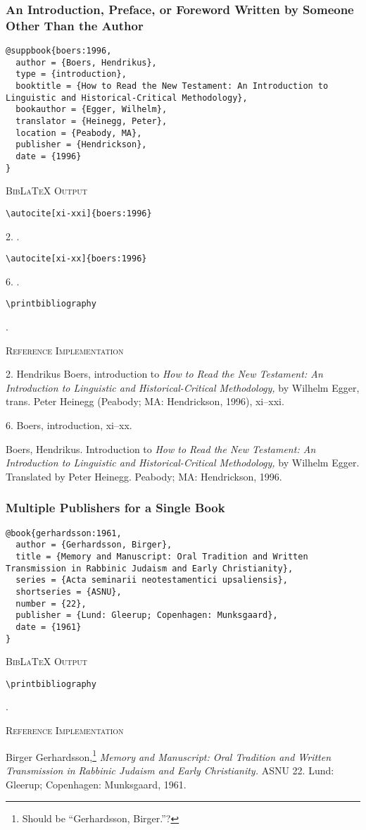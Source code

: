 \documentclass[a4paper]{article}
\newcommand\citetest[5]{%
  {\textsc{BibLaTeX Output}\par
   \nobreak
   \texttt{\textbackslash autocite[#2]\{#5\}}\par
   \color{biblatex-colour}
   #1. \cite[#2]{#5}.\par
   \color{black}
   \texttt{\textbackslash autocite[#4]\{#5\}}\par
   \color{biblatex-colour}
   #3. \cite[#4]{#5}.\par
   \color{black}
   \texttt{\textbackslash printbibliography}\par
   \color{biblatex-colour}
   \hangindent\bibindent\bibentrycite{#5}.\par}}
\newcommand\citetestonlybib[1]{%
  {\textsc{BibLaTeX Output}\par
   \nobreak
   \color{black}
   \texttt{\textbackslash printbibliography}\par
   \color{biblatex-colour}
   \hangindent\bibindent\bibentrycite{#1}.\par}}
\newenvironment{refimp}{%
  \begin{minipage}{\linewidth}
    \setlength{\parskip}{1ex}
    \textsc{Reference Implementation}\par
    \nobreak
    \color{reference-colour}
}{\end{minipage}}
\begin{document}
\subsubsection{An Introduction, Preface, or Foreword Written by Someone Other
Than the Author}

\begin{lstlisting}
@suppbook{boers:1996,
  author = {Boers, Hendrikus},
  type = {introduction},
  booktitle = {How to Read the New Testament: An Introduction to Linguistic and Historical-Critical Methodology},
  bookauthor = {Egger, Wilhelm},
  translator = {Heinegg, Peter},
  location = {Peabody, MA},
  publisher = {Hendrickson},
  date = {1996}
}
\end{lstlisting}  

\citetest{2}{xi-xxi}{6}{xi-xx}{boers:1996}

\begin{refimp}
  2. Hendrikus Boers, introduction to \emph{How to Read the New Testament: An
  Introduction to Linguistic and Historical-Critical Methodology,} by Wilhelm
  Egger, trans. Peter Heinegg (Peabody; MA: Hendrickson, 1996), xi–xxi.

  6. Boers, introduction, xi–xx.

  \hangindent\bibindent Boers, Hendrikus. Introduction to \emph{How to Read
  the New Testament: An Introduction to Linguistic and Historical-Critical
  Methodology,} by Wilhelm Egger. Translated by Peter Heinegg. Peabody; MA:
  Hendrickson, 1996.
\end{refimp}

\subsubsection{Multiple Publishers for a Single Book}

\begin{lstlisting}
@book{gerhardsson:1961,
  author = {Gerhardsson, Birger},
  title = {Memory and Manuscript: Oral Tradition and Written Transmission in Rabbinic Judaism and Early Christianity},
  series = {Acta seminarii neotestamentici upsaliensis},
  shortseries = {ASNU},
  number = {22},
  publisher = {Lund: Gleerup; Copenhagen: Munksgaard},
  date = {1961}
}
\end{lstlisting}

\citetestonlybib{gerhardsson:1961}

\begin{refimp}
  \hangindent\bibindent Birger Gerhardsson,\footnote{Should be “Gerhardsson,
  Birger.”?} \emph{Memory and Manuscript: Oral Tradition and Written
  Transmission in Rabbinic Judaism and Early Christianity.} ASNU 22. Lund:
  Gleerup; Copenhagen: Munksgaard, 1961.
\end{refimp}
\end{document}
